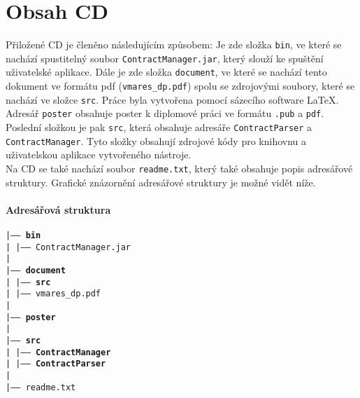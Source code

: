 \chapter{Obsah CD}
	Přiložené CD je členěno následujícím způsobem: Je zde složka \texttt{bin}, ve které se nachází spustitelný soubor \texttt{ContractManager.jar}, který slouží ke spuštění uživatelské aplikace. Dále je zde složka \texttt{document}, ve které se nachází tento dokument ve formátu pdf (\texttt{vmares\_dp.pdf}) spolu se zdrojovými soubory, které se nachází ve složce \texttt{src}. Práce byla vytvořena pomocí sázecího software LaTeX.\\
	
	Adresář \texttt{poster} obsahuje poster k diplomové práci ve formátu \texttt{.pub} a \texttt{pdf}. Poslední složkou je pak \texttt{src}, která obsahuje adresáře \texttt{ContractParser} a \texttt{ContractManager}. Tyto složky obsahují zdrojové kódy pro knihovnu a uživatelskou aplikace vytvořeného nástroje.\\
	
	Na CD se také nachází soubor \texttt{readme.txt}, který také obsahuje popis adresářové struktury. Grafické znázornění adresářové struktury je možné vidět níže.

	\subsubsection{Adresářová struktura}
	\noindent
	\texttt{|----- \textbf{bin}}\\
	\texttt{|\- \- \- \- |----- ContractManager.jar}\\
	\texttt{|}\\
	\texttt{|----- \textbf{document}}\\
	\texttt{|\- \- \- \- |----- \textbf{src}}\\
	\texttt{|\- \- \- \- |----- vmares\_dp.pdf}\\
	\texttt{|}\\
	\texttt{|----- \textbf{poster}}\\
	\texttt{|}\\
	\texttt{|----- \textbf{src}}\\
	\texttt{|\- \- \- \- |----- \textbf{ContractManager}}\\
	\texttt{|\- \- \- \- |----- \textbf{ContractParser}}\\
	\texttt{|}\\
	\texttt{|----- readme.txt}\\